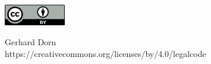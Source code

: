 \documentclass[12pt,a4paper]{article} %
\begin{document}



\vspace{2cm}
\begin{minipage}[t]{1\textwidth}
	\raggedleft
	\centering
	\includegraphics[width = 0.20\textwidth]{CC-BY_icon}
	\vspace{0.2cm}
	
	\centering
	{\Large Gerhard Dorn} \\
	https://creativecommons.org/licenses/by/4.0/legalcode
\end{minipage}






  
\end{document}
